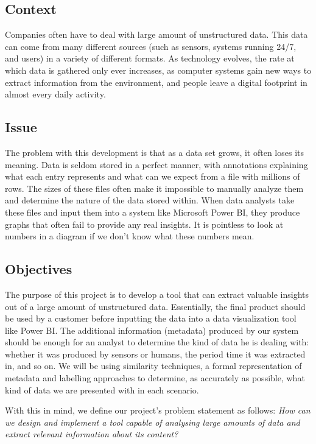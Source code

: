 \subsection{Context}
Companies often have to deal with large amount of unstructured data.
This data can come from many different sources (such as sensors, systems running 24/7, and users) in a variety of
different formats.
As technology evolves, the rate at which data is gathered only ever increases, as computer systems gain new ways to
extract information from the environment, and people leave a digital footprint in almost every daily activity.

\subsection{Issue}
The problem with this development is that as a data set grows, it often loses its meaning.
Data is seldom stored in a perfect manner, with annotations explaining what each entry represents and what can we
expect from a file with millions of rows.
The sizes of these files often make it impossible to manually analyze them and determine the nature of the data stored within.
When data analysts take these files and input them into a system like Microsoft Power BI, they produce graphs that often fail to
provide any real insights. 
It is pointless to look at numbers in a diagram if we don't know what these numbers mean.

\subsection{Objectives}
The purpose of this project is to develop a tool that can extract valuable insights out of a large amount of unstructured data.
Essentially, the final product should be used by a customer before inputting the data into a data visualization tool like Power BI.
The additional information (metadata) produced by our system should be enough for an analyst to determine the kind of data
he is dealing with: whether it was produced by sensors or humans, the period time it was extracted in, and so on.
We will be using similarity techniques, a formal representation of metadata and labelling approaches to determine, as
accurately as possible, what kind of data we are presented with in each scenario.

\bigbreak

With this in mind, we define our project's problem statement as follows:
\textit{How can we design and implement a tool capable of analysing large amounts of data and extract relevant
information about its content?}

